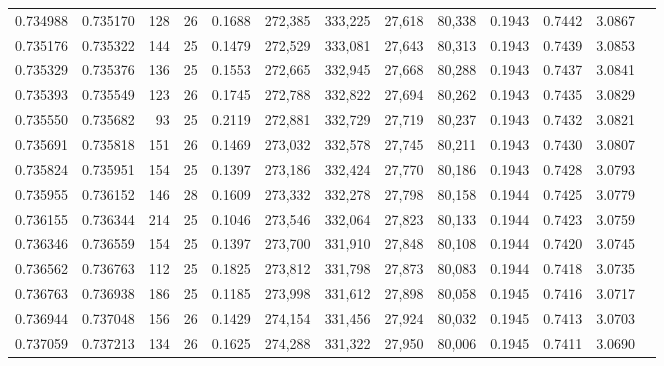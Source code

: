 \begin{tabular}{rrrrrrrrrrrrr}
0.734988 & 0.735170 &   128 &  26 &                                     0.1688 & 272,385 & 333,225 &  27,618 &  80,338 & 0.1943 & 0.7442 & 3.0867 \\
0.735176 & 0.735322 &   144 &  25 &                                     0.1479 & 272,529 & 333,081 &  27,643 &  80,313 & 0.1943 & 0.7439 & 3.0853 \\
0.735329 & 0.735376 &   136 &  25 &                                     0.1553 & 272,665 & 332,945 &  27,668 &  80,288 & 0.1943 & 0.7437 & 3.0841 \\
0.735393 & 0.735549 &   123 &  26 &                                     0.1745 & 272,788 & 332,822 &  27,694 &  80,262 & 0.1943 & 0.7435 & 3.0829 \\
0.735550 & 0.735682 &    93 &  25 &                                     0.2119 & 272,881 & 332,729 &  27,719 &  80,237 & 0.1943 & 0.7432 & 3.0821 \\
0.735691 & 0.735818 &   151 &  26 &                                     0.1469 & 273,032 & 332,578 &  27,745 &  80,211 & 0.1943 & 0.7430 & 3.0807 \\
0.735824 & 0.735951 &   154 &  25 &                                     0.1397 & 273,186 & 332,424 &  27,770 &  80,186 & 0.1943 & 0.7428 & 3.0793 \\
0.735955 & 0.736152 &   146 &  28 &                                     0.1609 & 273,332 & 332,278 &  27,798 &  80,158 & 0.1944 & 0.7425 & 3.0779 \\
0.736155 & 0.736344 &   214 &  25 &                                     0.1046 & 273,546 & 332,064 &  27,823 &  80,133 & 0.1944 & 0.7423 & 3.0759 \\
0.736346 & 0.736559 &   154 &  25 &                                     0.1397 & 273,700 & 331,910 &  27,848 &  80,108 & 0.1944 & 0.7420 & 3.0745 \\
0.736562 & 0.736763 &   112 &  25 &                                     0.1825 & 273,812 & 331,798 &  27,873 &  80,083 & 0.1944 & 0.7418 & 3.0735 \\
0.736763 & 0.736938 &   186 &  25 &                                     0.1185 & 273,998 & 331,612 &  27,898 &  80,058 & 0.1945 & 0.7416 & 3.0717 \\
0.736944 & 0.737048 &   156 &  26 &                                     0.1429 & 274,154 & 331,456 &  27,924 &  80,032 & 0.1945 & 0.7413 & 3.0703 \\
0.737059 & 0.737213 &   134 &  26 &                                     0.1625 & 274,288 & 331,322 &  27,950 &  80,006 & 0.1945 & 0.7411 & 3.0690 \\

\end{tabular}
